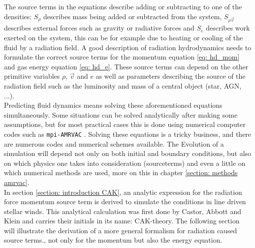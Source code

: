 The source terms in the equations describe adding or subtracting to one of the densities: $S_\rho$ describes mass being added or subtracted from the system, $S_{\rho \vec{v}}$ describes external forces such as gravity or radiative forces and $S_e$ describes work exerted on the system, this can be for example due to heating or cooling of the fluid by a radiation field. A good description of radiation hydrodynamics needs to formulate the correct source terms for the momentum equation \eqref{eq: hd_mom} and gas energy equation \eqref{eq: hd_e}. These source terms can depend on the other primitive variables $\rho$, $\vec{v}$ and $e$ as well as parameters describing the source of the radiation field such as the luminosity and mass of a central object (star, AGN, ...).\\

Predicting fluid dynamics means solving these aforementioned equations simultaneously. Some situations can be solved analytically after making some assumptions, but for most practical cases this is done using numerical computer codes such as \texttt{mpi-AMRVAC} \citep{Porth2014}. Solving these equations is a tricky business, and there are numerous codes and numerical schemes available. The Evolution of a simulation will depend not only on both initial and boundary conditions, but also on which physics one takes into consideration (sourceterms) and even a little on which numerical methods are used, more on this in chapter \ref{section: methods amrvac}. \\

In section \ref{section: introduction CAK}, an analytic expression for the radiation force momentum source term is derived to simulate the conditions in line driven stellar winds. This analytical calculation was first done by Castor, Abbott and Klein \citep{CAK1975} and carries their initials in its name: CAK-theory. The following section will illustrate the derivation of a more general formalism for radiation caused source terms., not only for the momentum but also the energy equation. 

